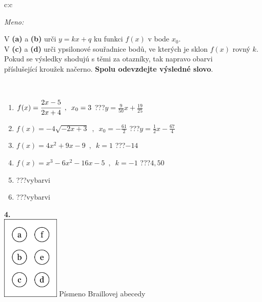 \documentclass[10pt]{report}
\begin{document}
\begin{tabular}{c:c}
\begin{minipage}[c][104.5mm][t]{0.5\linewidth}
\begin{center}
\textit{Meno:}\phantom{xxxxxxxxxxxxxxxxxxxxxxxxxxxxxxxxxxxxxxxxxxxxxxxxxxxxxxxxxxxxxxxxx}\\[5mm]
\begin{minipage}{0.95\linewidth}
\begin{center}
V \textbf{(a)} a \textbf{(b)} urči  $y = kx + q$ ku funkci $f(x)$ v bode $x_0$.\\V \textbf{(c)} a \textbf{(d)} urči ypsilonové souřadnice bodů, ve kterých je sklon $f(x)$ rovný $k$.\\Pokud se výsledky shodujú s těmi za otazníky, tak napravo obarvi\\příslušející kroužek načerno. \textbf{Spolu odevzdejte výsledné slovo}.
\end{center}
\end{minipage}
\\[1mm]
\begin{minipage}{0.79\linewidth}
\begin{center}
\begin{varwidth}{\linewidth}
\begin{enumerate}
\small
\item $f(x)=\cfrac{2x-5}{2x+4}\enspace , \enspace x_0=3$\quad \dotfill\; ???\;\dotfill \quad $y = \frac{9}{50}x+\frac{19}{25}$
\item $f(x)=-4\sqrt{-2x+3}\enspace , \enspace x_0=-\frac{61}{2}$\quad \dotfill\; ???\;\dotfill \quad $y = \frac{1}{2}x-\frac{67}{4}$
\item $f(x)=4x^2+9x-9\enspace , \enspace k=1$\quad \dotfill\; ???\;\dotfill \quad $-14$
\item $f(x)=x^3-6x^2-16x-5\enspace , \enspace k=-1$\quad \dotfill\; ???\;\dotfill \quad $4 , 50$
\item \quad \dotfill\; ???\;\dotfill \quad vybarvi
\item \quad \dotfill\; ???\;\dotfill \quad vybarvi
\end{enumerate}
\end{varwidth}
\end{center}
\end{minipage}
\begin{minipage}{0.20\linewidth}
\begin{center}
{\Huge\bfseries 4.} \\[2mm]
\includegraphics[height=40mm]{../images/braille.png}
{\small Písmeno Braillovej abecedy}
\end{center}
\end{minipage}
\end{center}
\end{minipage}
%
\end{tabular}
\end{document}
